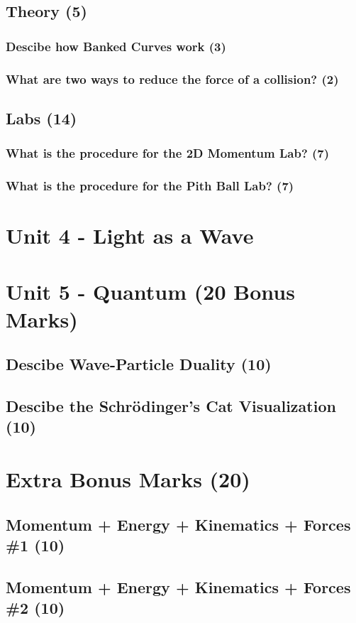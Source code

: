 \documentclass{article}
\begin{document}
\subsection{Theory (5)}
\subsubsection{Descibe how Banked Curves work (3)}
\subsubsection{What are two ways to reduce the force of a collision? (2)}

\subsection{Labs (14)}
\subsubsection{What is the procedure for the 2D Momentum Lab? (7)}
\subsubsection{What is the procedure for the Pith Ball Lab? (7)}



\section{Unit 4 - Light as a Wave}



\section{Unit 5 - Quantum (20 Bonus Marks)}
\subsection{Descibe Wave-Particle Duality (10)}
\subsection{Descibe the Schrödinger's Cat Visualization (10)}


\section{Extra Bonus Marks (20)}
\subsection{Momentum + Energy + Kinematics + Forces \#1 (10)}
\subsection{Momentum + Energy + Kinematics + Forces \#2 (10)}
\end{document}
